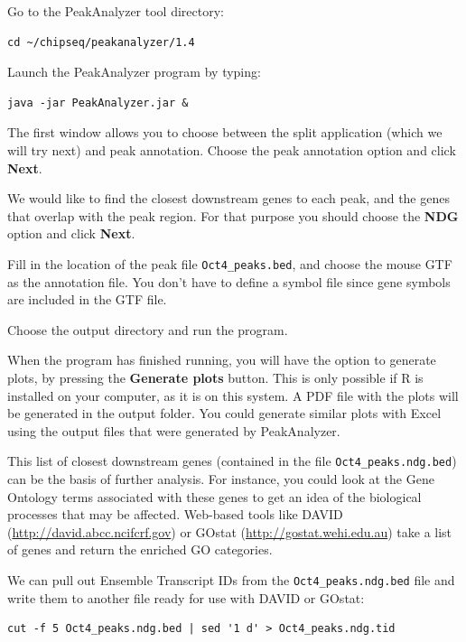 \begin{steps}
Go to the PeakAnalyzer tool directory:
\begin{lstlisting}
cd ~/chipseq/peakanalyzer/1.4
\end{lstlisting}
Launch the PeakAnalyzer program by typing:
\begin{lstlisting}
java -jar PeakAnalyzer.jar &
\end{lstlisting}

The first window allows you to choose between the split application (which we
will try next) and peak annotation. Choose the peak annotation option and click
\textbf{Next}.

We would like to find the closest downstream genes to each peak, and the genes
that overlap with the peak region. For that purpose you should choose the
\textbf{NDG} option and click \textbf{Next}.

Fill in the location of the peak file \texttt{Oct4\_peaks.bed}, and choose the mouse GTF
as the annotation file. You don't have to define a symbol file since gene
symbols are included in the GTF file.

Choose the output directory and run the program.
\end{steps}

\begin{information}
When the program has finished running, you will have the option to generate
plots, by pressing the \textbf{Generate plots} button. This is only possible if R is
installed on your computer, as it is on this system. A PDF file with the plots will be generated in
the output folder. You could generate similar plots with Excel using the output files that
were generated by PeakAnalyzer. 
\end{information}

\begin{note}
This list of closest downstream genes (contained in the file
\texttt{Oct4\_peaks.ndg.bed}) can be the basis of further analysis. For instance,
you could look at the Gene Ontology terms associated with these genes to get an
idea of the biological processes that may be affected. Web-based tools like
DAVID (\url{http://david.abcc.ncifcrf.gov}) or GOstat
(\url{http://gostat.wehi.edu.au}) take a list of genes and return the enriched
GO categories.
\end{note}

\begin{bonus}
We can pull out Ensemble Transcript IDs from the \texttt{Oct4\_peaks.ndg.bed}
file and write them to another file ready for use with DAVID or GOstat:
\begin{lstlisting}
cut -f 5 Oct4_peaks.ndg.bed | sed '1 d' > Oct4_peaks.ndg.tid
\end{lstlisting}
\end{bonus}

